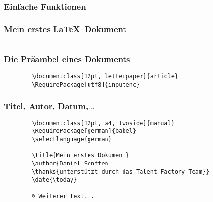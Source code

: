 \begin{frame}[fragile]
    \frametitle<presentation>{Einfache Funktionen}
    \begin{center}
    \end{center}
\end{frame}


\begin{frame}[fragile]
    \frametitle<presentation>{Mein erstes \LaTeX\ Dokument}
    \inputminted[frame=single]{latex}{examples/first.tex}
\end{frame}


\begin{frame}[fragile]
    \frametitle<presentation>{Die Präambel eines Dokuments}

    \begin{verbatim}
        \documentclass[12pt, letterpaper]{article}
        \RequirePackage[utf8]{inputenc}
    \end{verbatim}
\end{frame}


\begin{frame}[fragile]
    \frametitle<presentation>{Titel, Autor, Datum,$\ldots$}

    \begin{verbatim}
        \documentclass[12pt, a4, twoside]{manual}
        \RequirePackage[german]{babel}
        \selectlanguage{german}

        \title{Mein erstes Dokument}
        \author{Daniel Senften
        \thanks{unterstützt durch das Talent Factory Team}}
        \date{\today}

        % Weiterer Text...
    \end{verbatim}
\end{frame}


